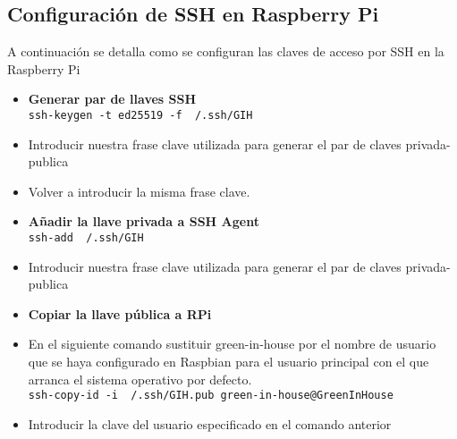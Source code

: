         \subsection{Configuración de SSH en Raspberry Pi}
        A continuación se detalla como se configuran las claves de acceso por SSH en la Raspberry Pi
        \begin{itemize}
            \item \textbf{Generar par de llaves SSH}
            \\ \texttt{ssh-keygen -t ed25519 -f ~/.ssh/GIH}
            \item Introducir nuestra frase clave utilizada para generar el par de claves privada-publica
            \item Volver a introducir la misma frase clave.
            \item \textbf{Añadir la llave privada a SSH Agent}
            \\ \texttt{ssh-add ~/.ssh/GIH}
            \item Introducir nuestra frase clave utilizada para generar el par de claves privada-publica
            \item \textbf{Copiar la llave pública a RPi}
            \item En el siguiente comando sustituir green-in-house por el nombre de usuario que se haya configurado en Raspbian para el usuario principal con el que arranca el sistema operativo por defecto.
            \\ \texttt{ssh-copy-id -i ~/.ssh/GIH.pub green-in-house@GreenInHouse}
            \item Introducir la clave del usuario especificado en el comando anterior
        \end{itemize}
